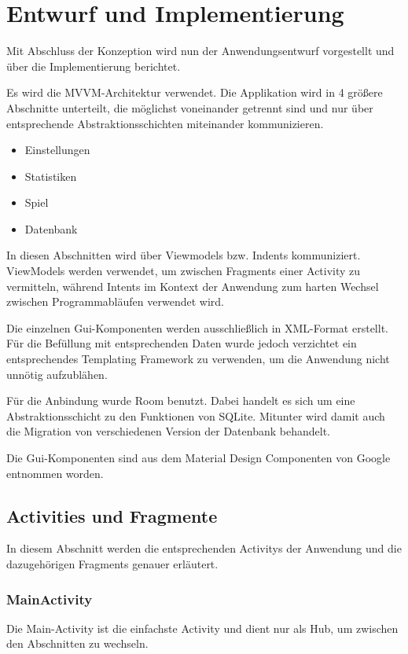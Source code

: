 
\section{Entwurf und Implementierung}
Mit Abschluss der Konzeption wird nun der Anwendungsentwurf vorgestellt und über
die Implementierung berichtet.

Es wird die MVVM-Architektur verwendet. Die Applikation wird in 4 größere
Abschnitte unterteilt, die möglichst voneinander getrennt sind und nur über
entsprechende Abstraktionsschichten miteinander kommunizieren.
\begin{itemize}[itemsep=0pt]
\item Einstellungen
\item Statistiken
\item Spiel
\item Datenbank
\end{itemize}
In diesen Abschnitten wird über Viewmodels bzw. Indents kommuniziert.
ViewModels werden verwendet, um zwischen Fragments einer Activity zu
vermitteln, während Intents im Kontext der Anwendung zum harten Wechsel zwischen
Programmabläufen verwendet wird.

Die einzelnen Gui-Komponenten werden ausschließlich in XML-Format erstellt. Für
die Befüllung mit entsprechenden Daten wurde jedoch verzichtet ein
entsprechendes Templating Framework zu verwenden, um die Anwendung nicht unnötig
aufzublähen.

Für die Anbindung wurde Room benutzt. Dabei handelt es sich um eine
Abstraktionsschicht zu den Funktionen von SQLite. Mitunter wird damit auch
die Migration von verschiedenen Version der Datenbank behandelt.

Die Gui-Komponenten sind aus dem Material Design Componenten von Google
entnommen worden.

\subsection{Activities und Fragmente}
In diesem Abschnitt werden die entsprechenden Activitys der Anwendung und
die dazugehörigen Fragments genauer erläutert.

\subsubsection{MainActivity}
Die Main-Activity ist die einfachste Activity und dient nur als Hub, um zwischen
den Abschnitten zu wechseln.

